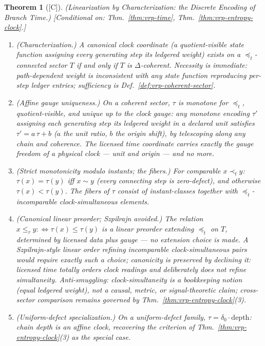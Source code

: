 \documentclass[12pt,oneside]{amsbook}
\theoremstyle{plain}
\newtheorem{theorem}{Theorem}[section]
\theoremstyle{definition}
\theoremstyle{remark}
\newcommand{\status}[1]{\textup{[#1]}}
\begin{document}
\begin{theorem}[\status{C}]\label{thm:vrp-time-linear}
\textup{(Linearization by Characterization: the Discrete Encoding
of Branch Time.)}
\textup{[Conditional on: Thm.~\ref{thm:vrp-time},
Thm.~\ref{thm:vrp-entropy-clock}.]}
\begin{enumerate}[label=\textup{(\arabic*)}]
  \item \emph{(Characterization.)}  A canonical clock coordinate
    (a quotient-visible state function assigning every generating
    step its ledgered weight) exists on a
    $\preceq_t$-connected sector $T$ \emph{if and only if} $T$ is
    $\Delta$-coherent.  Necessity is immediate: path-dependent
    weight is inconsistent with any state function reproducing
    per-step ledger entries; sufficiency is
    Def.~\ref{def:vrp-coherent-sector}.
  \item \emph{(Affine gauge uniqueness.)}  On a coherent sector,
    $\tau$ is monotone for $\preceq_t$, quotient-visible, and
    unique up to the clock gauge: any monotone encoding $\tau'$
    assigning each generating step its ledgered weight in a
    declared unit satisfies $\tau' = a\,\tau + b$ ($a$ the unit
    ratio, $b$ the origin shift), by telescoping along any chain
    and coherence.  The licensed time coordinate carries exactly
    the gauge freedom of a physical clock --- unit and origin ---
    and no more.
  \item \emph{(Strict monotonicity modulo instants; the fibers.)}
    For comparable $x \prec_t y$: $\tau(x) = \tau(y)$ iff $x \sim
    y$ (every connecting step is zero-defect), and otherwise
    $\tau(x) < \tau(y)$.  The fibers of $\tau$ consist of
    instant-classes together with $\preceq_t$-incomparable
    clock-simultaneous elements.
  \item \emph{(Canonical linear preorder; Szpilrajn avoided.)}
    The relation $x \le_\tau y :\iff \tau(x) \le \tau(y)$ is a
    \emph{linear preorder} extending $\preceq_t$ on $T$,
    determined by licensed data plus gauge --- no extension choice
    is made.  A Szpilrajn-style linear \emph{order} refining
    incomparable clock-simultaneous pairs would require exactly
    such a choice; canonicity is preserved by declining it:
    licensed time totally orders clock readings and deliberately
    does not refine simultaneity.  Anti-smuggling:
    clock-simultaneity is a bookkeeping notion (equal ledgered
    weight), not a causal, metric, or signal-theoretic claim;
    cross-sector comparison remains governed by
    Thm.~\ref{thm:vrp-entropy-clock}(3).
  \item \emph{(Uniform-defect specialization.)}  On a
    uniform-defect family, $\tau = \delta_0 \cdot
    \mathrm{depth}$: chain depth is an affine clock, recovering
    the criterion of Thm.~\ref{thm:vrp-entropy-clock}(3) as the
    special case.
\end{enumerate}
\end{theorem}
\end{document}
